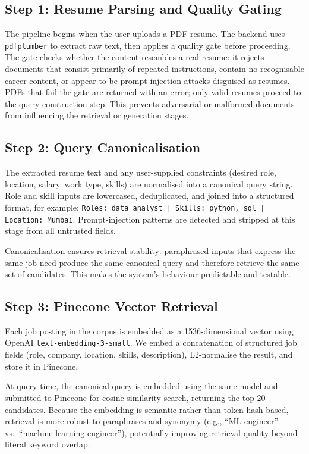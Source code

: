 \documentclass[11pt]{article}
\begin{document}
\subsection{Step 1: Resume Parsing and Quality Gating}

The pipeline begins when the user uploads a PDF resume. The backend uses \texttt{pdfplumber} to extract raw text, then applies a quality gate before proceeding. The gate checks whether the content resembles a real resume: it rejects documents that consist primarily of repeated instructions, contain no recognisable career content, or appear to be prompt-injection attacks disguised as resumes. PDFs that fail the gate are returned with an error; only valid resumes proceed to the query construction step. This prevents adversarial or malformed documents from influencing the retrieval or generation stages.

\subsection{Step 2: Query Canonicalisation}

The extracted resume text and any user-supplied constraints (desired role, location, salary, work type, skills) are normalised into a canonical query string. Role and skill inputs are lowercased, deduplicated, and joined into a structured format, for example: \texttt{Roles: data analyst | Skills: python, sql | Location: Mumbai}. Prompt-injection patterns are detected and stripped at this stage from all untrusted fields.

Canonicalisation ensures retrieval stability: paraphrased inputs that express the same job need produce the same canonical query and therefore retrieve the same set of candidates. This makes the system's behaviour predictable and testable.

\subsection{Step 3: Pinecone Vector Retrieval}

Each job posting in the corpus is embedded as a 1536-dimensional vector using OpenAI \texttt{text-embedding-3-small}. We embed a concatenation of structured job fields (role, company, location, skills, description), L2-normalise the result, and store it in Pinecone.

At query time, the canonical query is embedded using the same model and submitted to Pinecone for cosine-similarity search, returning the top-20 candidates. Because the embedding is semantic rather than token-hash based, retrieval is more robust to paraphrases and synonymy (e.g., ``ML engineer'' vs.\ ``machine learning engineer''), potentially improving retrieval quality beyond literal keyword overlap.
\end{document}
